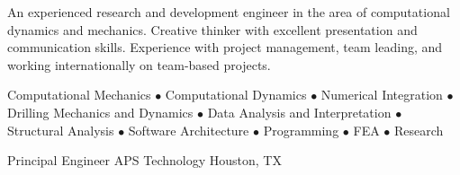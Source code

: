 \documentclass{resume}
\begin{document}
	\thispagestyle{lefooterhorizontalline}
	\makeresumeheaderC
	
	An experienced research and development engineer in the area of computational dynamics and mechanics. Creative thinker with excellent presentation and communication skills. Experience with project management, team leading, and working internationally on team-based projects.

	Computational Mechanics $\bullet$ Computational Dynamics $\bullet$ Numerical Integration $\bullet$ Drilling Mechanics and Dynamics $\bullet$ Data Analysis and Interpretation $\bullet$ Structural Analysis $\bullet$ Software Architecture $\bullet$ Programming $\bullet$ FEA $\bullet$ Research

    
            {Principal Engineer}
            {APS Technology}
			{Houston, TX}
			
\end{document}
